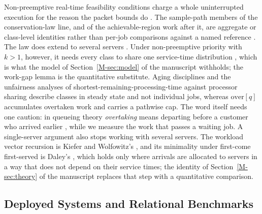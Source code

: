 \documentclass[mathematics,supfile,submit,moreauthors]{Definitions/mdpi}
\begin{document}
Non-preemptive real-time feasibility conditions charge a whole uninterrupted execution
for the reason the packet bounds do \cite{jeffay1991nonpreemptive}. The sample-path
members of the conservation-law line, and of the achievable-region work after it, are
aggregate or class-level identities rather than per-job comparisons against a named
reference \cite{green2000samplepath,eltaha2017workload}. The law does extend to several
servers \cite{bartsch1978conservation}. Under non-preemptive priority with $k>1$,
however, it needs every class to share one service-time distribution
\cite{federgruen1988mgc}, which is what the model of Section~\ref*{M-sec:model} of the manuscript
withholds; the work-gap lemma is the quantitative substitute. Aging disciplines
\cite{kleinrock1964delay,stanford2014apq} and the unfairness analyses of
shortest-remaining-processing-time against processor sharing
\cite{bansal2001srpt,wierman2003classifying} describe classes in steady state and not
individual jobs, whereas $\mathrm{over}[q]$ accumulates overtaken work and carries a
pathwise cap. The word itself needs one caution: in queueing theory \emph{overtaking}
means departing before a customer who arrived earlier
\cite{whitt1984overtaking,kim2016overtaking}, while we measure the work that passes a
waiting job. A single-server argument also stops working with several servers. The
workload vector recursion is Kiefer and Wolfowitz's \cite{kiefer1955queues}, and its
minimality under first-come first-served is Daley's \cite{daley1987fcfs}, which holds
only where arrivals are allocated to servers in a way that does not depend on their
service times; the identity of Section~\ref*{M-sec:theory} of the manuscript replaces that step with a
quantitative comparison.

\subsection{Deployed Systems and Relational Benchmarks}
\end{document}
